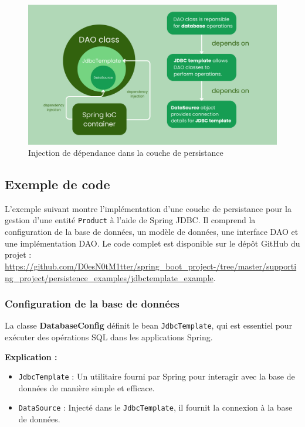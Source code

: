 \documentclass{article}
\begin{document}
\begin{figure}[H]
    \centering
    \begin{framed}
        \includegraphics[width=0.8\linewidth]{images/minimalistic_jdbctemplate.png}
    \end{framed}
    \caption{Injection de dépendance dans la couche de persistance}
    \label{fig:spring-logo}
\end{figure}
\subsection{Exemple de code}

L'exemple suivant montre l'implémentation d'une couche de persistance pour la gestion d'une entité \texttt{Product} à l'aide de Spring JDBC. Il comprend la configuration de la base de données, un modèle de données, une interface DAO et une implémentation DAO. Le code complet est disponible sur le dépôt GitHub du projet : \\ \url{https://github.com/D0esN0tM1tter/spring_boot_project-/tree/master/supporting_project/persistence_examples/jdbctemplate_example}.

\subsubsection{Configuration de la base de données}

La classe \textbf{DatabaseConfig} définit le bean \texttt{JdbcTemplate}, qui est essentiel pour exécuter des opérations SQL dans les applications Spring.

\textbf{Explication :}
\begin{itemize}
    \item \texttt{JdbcTemplate} : Un utilitaire fourni par Spring pour interagir avec la base de données de manière simple et efficace.
    \item \texttt{DataSource} : Injecté dans le \texttt{JdbcTemplate}, il fournit la connexion à la base de données.
\end{itemize}
\end{document}
